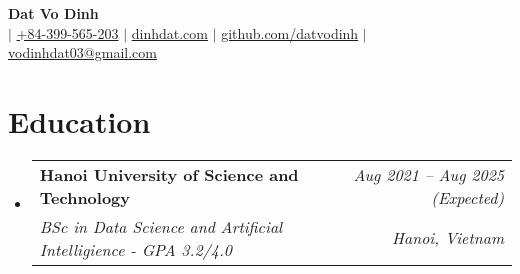 \documentclass[letterpaper,11pt]{article}
\makeatletter
\newcommand{\resumeSubheading}[4]{
  \vspace{-1pt}\item
    \begin{tabular*}{0.97\textwidth}[t]{l@{\extracolsep{\fill}}r}
      \textbf{#1} & \textit{\small #2} \\
      \textit{\small #3} & \textit{\small #4} \\
    \end{tabular*}\vspace{-6pt}
}
\newcommand{\resumeSubHeadingListStart}{\begin{itemize}[leftmargin=*,label={}]}
\newcommand{\resumeSubHeadingListEnd}{\end{itemize}}
\makeatother
\begin{document}

\begin{center}
  \textbf{\Huge {Dat Vo Dinh}} \\ \vspace{4pt}
   $|$ \href{tel:+84399565203}{{+84-399-565-203}} $|$ \href{https://dinhdat.com}{{dinhdat.com}}
  $|$ \href{https://github.com/datvodinh/}{{github.com/datvodinh}} $|$ \href{mailto:vodinhdat03@gmail.com}{{vodinhdat03@gmail.com}}
\end{center}

\section{Education}
\resumeSubHeadingListStart
  \resumeSubheading
    {Hanoi University of Science and Technology}{Aug 2021 -- Aug 2025 (Expected)}
    {BSc in Data Science and Artificial Intelligience - GPA 3.2/4.0}{\textit{Hanoi, Vietnam}}
\resumeSubHeadingListEnd

  
\end{document}
